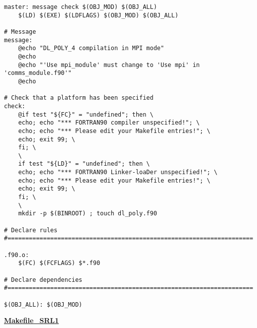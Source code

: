 \begin{verbatim}
master: message check $(OBJ_MOD) $(OBJ_ALL)
	$(LD) $(EXE) $(LDFLAGS) $(OBJ_MOD) $(OBJ_ALL)

# Message
message:
	@echo "DL_POLY_4 compilation in MPI mode"
	@echo
	@echo "'Use mpi_module' must change to 'Use mpi' in 'comms_module.f90'"
	@echo

# Check that a platform has been specified
check:
	@if test "${FC}" = "undefined"; then \
	echo; echo "*** FORTRAN90 compiler unspecified!"; \
	echo; echo "*** Please edit your Makefile entries!"; \
	echo; exit 99; \
	fi; \
	\
	if test "${LD}" = "undefined"; then \
	echo; echo "*** FORTRAN90 Linker-loaDer unspecified!"; \
	echo; echo "*** Please edit your Makefile entries!"; \
	echo; exit 99; \
	fi; \
	\
	mkdir -p $(BINROOT) ; touch dl_poly.f90

# Declare rules
#=====================================================================

.f90.o:
	$(FC) $(FCFLAGS) $*.f90

# Declare dependencies
#=====================================================================

$(OBJ_ALL): $(OBJ_MOD)
\end{verbatim}
\clearpage
{\sc \bf \underline{Makefile\_SRL1}}
